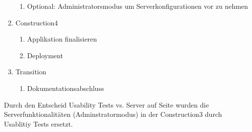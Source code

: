 \begin{enumerate}
\begin{enumerate}
    \item Optional: Administratorsmodus um Serverkonfigurationen vor zu nehmen
  \end{enumerate}
      \item Construction4
  \begin{enumerate}
    \item Applikation finalisieren
    \item Deployment
  \end{enumerate}
  \item Transition
  \begin{enumerate}
    \item Dokumentationsabschluss
  \end{enumerate}
\end{enumerate}

Durch den Entscheid Usability Tests vs. Server auf Seite \pageref{UsabilityEntscheid} wurden die Serverfunktionalitäten (Adminstratormodus) in der Construction3 durch Usablitiy Tests ersetzt.
\newpage







